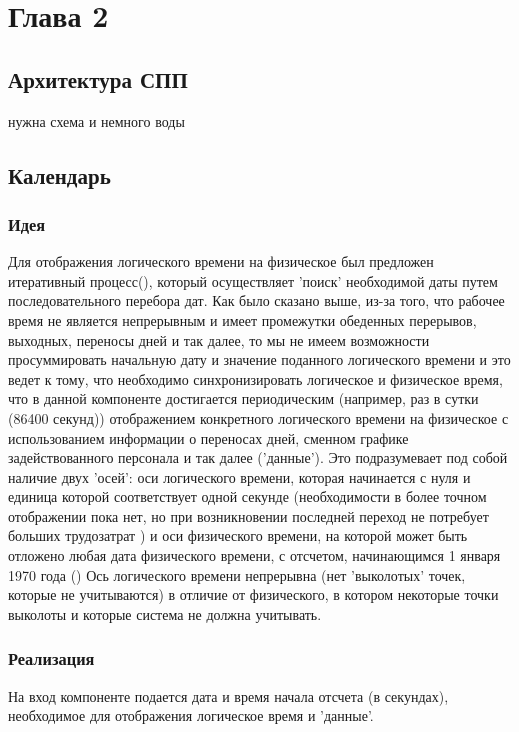 \chapter{Глава 2}
\section{Архитектура СПП}
нужна схема и немного воды
\section{Календарь}
\subsection{Идея}
Для отображения логического времени на физическое был предложен итеративный процесс(), который осуществляет 'поиск' необходимой даты путем последовательного перебора дат.
\newline
Как было сказано выше, из-за того, что рабочее время не является непрерывным и имеет промежутки обеденных перерывов, выходных, переносы дней и так далее, то мы не имеем возможности просуммировать начальную дату и значение поданного логического времени и это ведет к тому, что необходимо синхронизировать логическое и физическое время, что в данной компоненте достигается периодическим (например, раз в сутки (86400 секунд)) отображением конкретного логического времени на физическое с использованием информации о переносах дней, сменном графике задействованного персонала и так далее ('данные').
\newline
{}
Это подразумевает под собой наличие двух 'осей': оси логического времени, которая начинается с нуля и единица которой соответствует одной секунде (необходимости в более точном отображении пока нет, но при возникновении последней переход не потребует больших трудозатрат ) и оси физического времени, на которой может быть отложено любая дата физического времени, с отсчетом, начинающимся 1 января 1970 года ()
Ось логического времени непрерывна (нет 'выколотых' точек, которые не учитываются) в отличие от физического, в котором некоторые точки выколоты и которые система не должна учитывать.
\newline
\subsection{Реализация}
На вход компоненте подается дата и время начала отсчета (в секундах), необходимое для отображения логическое время и 'данные'. 



